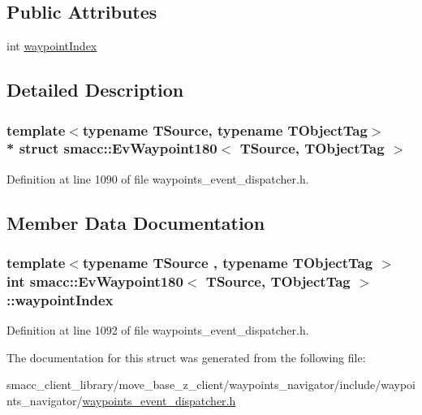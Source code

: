 \subsection*{Public Attributes}
\begin{DoxyCompactItemize}
\item 
int \hyperlink{structsmacc_1_1EvWaypoint180_ae614c6dc3049656ea9d27b522085c33a}{waypoint\+Index}
\end{DoxyCompactItemize}


\subsection{Detailed Description}
\subsubsection*{template$<$typename T\+Source, typename T\+Object\+Tag$>$\\*
struct smacc\+::\+Ev\+Waypoint180$<$ T\+Source, T\+Object\+Tag $>$}



Definition at line 1090 of file waypoints\+\_\+event\+\_\+dispatcher.\+h.



\subsection{Member Data Documentation}
\subsubsection[{\texorpdfstring{waypoint\+Index}{waypointIndex}}]{\setlength{\rightskip}{0pt plus 5cm}template$<$typename T\+Source , typename T\+Object\+Tag $>$ int {\bf smacc\+::\+Ev\+Waypoint180}$<$ T\+Source, T\+Object\+Tag $>$\+::waypoint\+Index}\hypertarget{structsmacc_1_1EvWaypoint180_ae614c6dc3049656ea9d27b522085c33a}{}\label{structsmacc_1_1EvWaypoint180_ae614c6dc3049656ea9d27b522085c33a}


Definition at line 1092 of file waypoints\+\_\+event\+\_\+dispatcher.\+h.



The documentation for this struct was generated from the following file\+:\begin{DoxyCompactItemize}
\item 
smacc\+\_\+client\+\_\+library/move\+\_\+base\+\_\+z\+\_\+client/waypoints\+\_\+navigator/include/waypoints\+\_\+navigator/\hyperlink{waypoints__event__dispatcher_8h}{waypoints\+\_\+event\+\_\+dispatcher.\+h}\end{DoxyCompactItemize}
